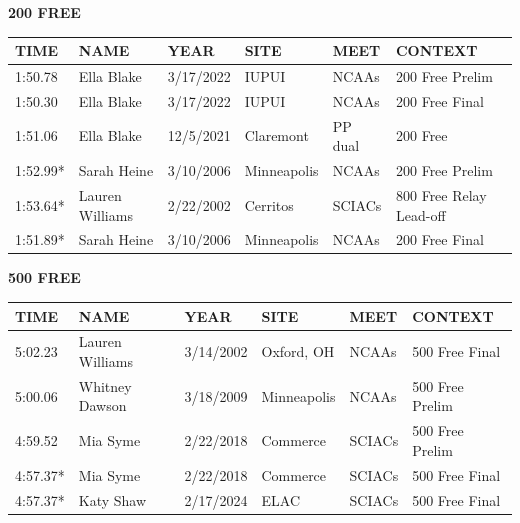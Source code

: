 \begin{table}[H]
\centering
\begin{minipage}[t]{0.48\textwidth}
\centering
\textbf{200 FREE}\\[0.1cm]
\begin{tabular}{@{}p{1.8cm}p{2.8cm}p{1.2cm}p{1.4cm}p{1.4cm}p{2.0cm}@{}}
\hline
    \textbf{TIME} & \textbf{NAME} & \textbf{YEAR} & \textbf{SITE} & \textbf{MEET} & \textbf{CONTEXT} \\
\hline
    1:50.78 & Ella Blake & 3/17/2022 & IUPUI & NCAAs & 200 Free Prelim \\
    1:50.30 & Ella Blake & 3/17/2022 & IUPUI & NCAAs & 200 Free Final \\
    1:51.06 & Ella Blake & 12/5/2021 & Claremont & PP dual & 200 Free \\
    1:52.99* & Sarah Heine & 3/10/2006 & Minneapolis & NCAAs & 200 Free Prelim \\
    1:53.64* & Lauren Williams & 2/22/2002 & Cerritos & SCIACs & 800 Free Relay Lead-off \\
    1:51.89* & Sarah Heine & 3/10/2006 & Minneapolis & NCAAs & 200 Free Final \\
\hline
\end{tabular}
\end{minipage}\hfill
\begin{minipage}[t]{0.48\textwidth}
\centering
\textbf{500 FREE}\\[0.1cm]
\begin{tabular}{@{}p{1.8cm}p{2.8cm}p{1.2cm}p{1.4cm}p{1.4cm}p{2.0cm}@{}}
\hline
    \textbf{TIME} & \textbf{NAME} & \textbf{YEAR} & \textbf{SITE} & \textbf{MEET} & \textbf{CONTEXT} \\
\hline
    5:02.23 & Lauren Williams & 3/14/2002 & Oxford, OH & NCAAs & 500 Free Final \\
    5:00.06 & Whitney Dawson & 3/18/2009 & Minneapolis & NCAAs & 500 Free Prelim \\
    4:59.52 & Mia Syme & 2/22/2018 & Commerce & SCIACs & 500 Free Prelim \\
    4:57.37* & Mia Syme & 2/22/2018 & Commerce & SCIACs & 500 Free Final \\
    4:57.37* & Katy Shaw & 2/17/2024 & ELAC & SCIACs & 500 Free Final \\
\hline
\end{tabular}
\end{minipage}
\end{table}

